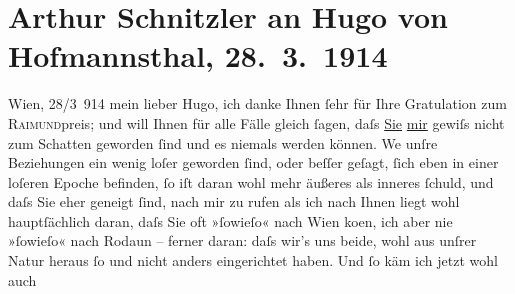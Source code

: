 

         
         \newcommand{\erwaehntePersonen}{Personen: Hugo von Hofmannsthal}
         \newcommand{\erwaehnteInstitutionen}{Institutionen: Raimund-Preis}
         \newcommand{\erwaehnteOrte}{Orte: Rodaun, Semmering, Wien}
         \newcommand{\erwaehnteWerke}{Werke: Die Frau ohne Schatten. Erzählung}
               \section[Arthur Schnitzler an Hugo von Hofmannsthal, 28. 3. 1914]{ Arthur Schnitzler an Hugo von Hofmannsthal, 28. 3. 1914}\nopagebreak{}\rehead{ }\begin{ledgroupsized}[t]{13cm}\normalsize\beginnumbering \toendnotes[C]{\smallbreak\pagebreak[2]} 
\toendnotes[C]{\smallbreak}\pstart
           \raggedleft{}{\pb}Wien, 28/3 914\pend
           \pstart
           mein lieber Hugo, ich danke Ihnen ſehr für Ihre Gratulation zum \textsc{Raimund}preis; und will Ihnen für alle Fälle gleich
               ſagen, daſs \uline{Sie}{ }\uline{mir} gewiſs nicht zum Schatten geworden ſind und es
               niemals werden können. We{\geminationn} unſre Beziehungen ein wenig
               loſer geworden ſind, oder beſſer geſagt, ſich \introOben{}eben\introOben{} in einer
               loſeren Epoche befinden, ſo iſt daran wohl mehr äußeres als inneres ſchuld,  und
               daſs Sie eher geneigt ſind, nach mir zu rufen als ich nach Ihnen liegt wohl
               hauptſächlich daran, daſs Sie oft »ſowieſo« nach Wien
                  ko{\geminationm}en, ich aber nie »ſowieſo« nach Rodaun – ferner daran: daſs wir’s uns beide, wohl aus unſrer
               Natur heraus ſo und nicht anders eingerichtet haben. Und ſo käm ich jetzt wohl auch

\end{ledgroupsized}
